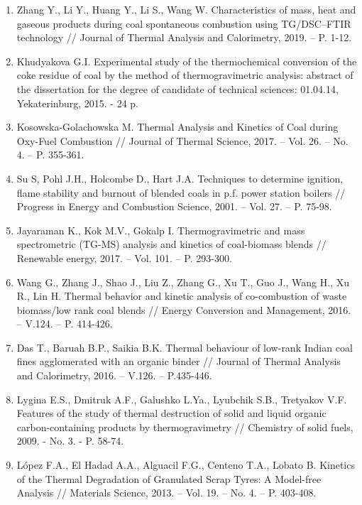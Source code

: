 \begin{enumerate}
\item
Zhang Y., Li Y., Huang Y., Li S., Wang W. Characteristics of mass,
heat and gaseous products during coal spontaneous combustion using
TG/DSC--FTIR technology // Journal of Thermal Analysis and Calorimetry,
2019. -- P. 1-12.

\item
Khudyakova G.I. Experimental study of the thermochemical conversion
of the coke residue of coal by the method of thermogravimetric analysis:
abstract of the dissertation for the degree of candidate of technical
sciences: 01.04.14, Yekaterinburg, 2015. - 24 p.

\item
Kosowska-Golachowska M. Thermal Analysis and Kinetics of Coal during
Oxy-Fuel Combustion // Journal of Thermal Science, 2017. -- Vol. 26. --
No. 4. -- P. 355-361.

\item
Su S, Pohl J.H., Holcombe D., Hart J.A. Techniques to determine
ignition, flame stability and burnout of blended coals in p.f. power
station boilers // Progress in Energy and Combustion Science, 2001. --
Vol. 27. -- P. 75-98.

\item
Jayaraman K., Kok M.V., Gokalp I. Thermogravimetric and mass
spectrometric (TG-MS) analysis and kinetics of coal-biomass blends //
Renewable energy, 2017. -- Vol. 101. -- P. 293-300.

\item
Wang G., Zhang J., Shao J., Liu Z., Zhang G., Xu T., Guo J., Wang H.,
Xu R., Lin H. Thermal behavior and kinetic analysis of co-combustion of
waste biomass/low rank coal blends // Energy Conversion and Management,
2016. -- V.124. -- P. 414-426.

\item
Das T., Baruah B.P., Saikia B.K. Thermal behaviour of low-rank Indian
coal fines agglomerated with an organic binder // Journal of Thermal
Analysis and Calorimetry, 2016. -- V.126. -- P.435-446.

\item
Lygina E.S., Dmitruk A.F., Galushko L.Ya., Lyubchik S.B., Tretyakov
V.F. Features of the study of thermal destruction of solid and liquid
organic carbon-containing products by thermogravimetry // Chemistry of
solid fuels, 2009. - No. 3. - P. 58-74.

\item
López F.A., El Hadad A.A., Alguacil F.G., Centeno T.A., Lobato B.
Kinetics of the Thermal Degradation of Granulated Scrap Tyres: A
Model-free Analysis // Materials Science, 2013. -- Vol. 19. -- No. 4. --
P. 403-408.


\end{enumerate}
